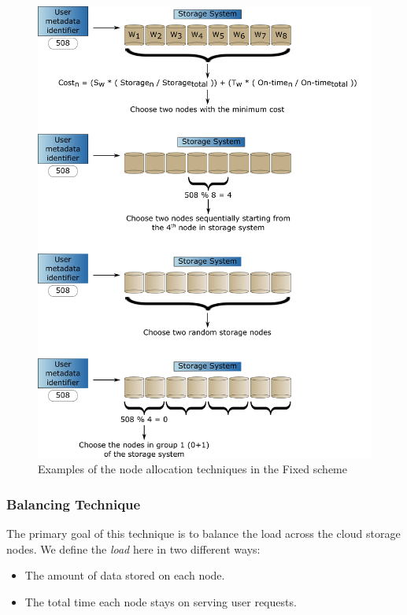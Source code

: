 \documentclass[preprint,12pt]{elsarticle}
\begin{document}
\begin{figure}[!htbp]
\centering
\includegraphics[width=\columnwidth,keepaspectratio]{FIG2.pdf}
\caption{Examples of the node allocation techniques in the Fixed scheme}
\label{fixed_examples}
\end{figure}

\subsubsection{Balancing Technique}
\label{baltechnique}
The primary goal of this technique is to balance the load across the cloud storage nodes. We
define the \textit{load} here in two different ways:

\begin{itemize}
\item The amount of data stored on each node.
\item The total time each node stays on serving user requests.
\end{itemize}
\end{document}
